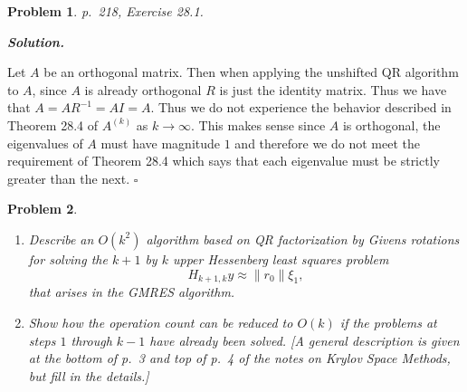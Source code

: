\documentclass[12pt]{report}
\newtheorem{problem}{Problem}
\newenvironment{solution}[1][\it{Solution}]{\textbf{#1. } }{$\square$}
\begin{document}
\newpage



\begin{problem}
    p.~218, Exercise 28.1.
\end{problem}

\begin{solution}
    
    Let $A$ be an orthogonal matrix. Then when applying the unshifted QR algorithm to $A$, since $A$ is already orthogonal $R$ is just the identity matrix. Thus we have that $A=AR^{-1} = AI = A$. Thus we do not experience the behavior described in Theorem 28.4 of $A^{(k)}$ as $k \to \infty$. This makes sense since $A$ is orthogonal, the eigenvalues of $A$ must have magnitude $1$ and therefore we do not meet the requirement of Theorem 28.4 which says that each eigenvalue must be strictly greater than the next. 
\end{solution}

\newpage



\begin{problem}

    \noindent
    \begin{enumerate}
        \item
        Describe an $O( k^2 )$ algorithm based on QR factorization by Givens rotations 
        for solving the $k+1$ by $k$ upper Hessenberg least squares problem
        \[
        H_{k+1,k} y \approx \| r_0 \| \xi_1 ,
        \]
        that arises in the GMRES algorithm.
        \item
        Show how the operation count can be reduced to $O(k)$ if the problems at steps
        $1$ through $k-1$ have already been solved.
        [A general description is given at the bottom of p.~3 and top of p.~4 of the notes
        on Krylov Space Methods, but fill in the details.] 
        \end{enumerate}
        
\end{problem}
\end{document}
